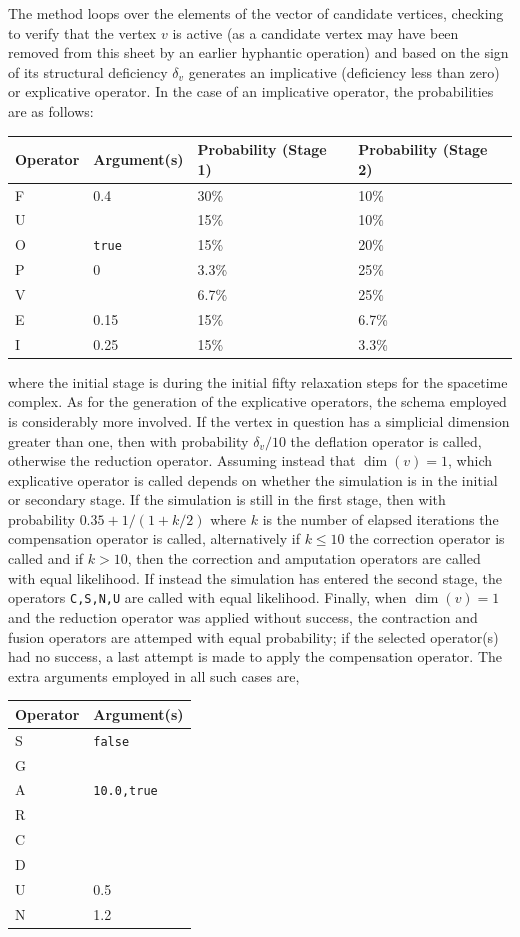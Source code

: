 \documentclass[12pt,letterpaper]{report}
\begin{document}
The method loops over the elements of the vector of candidate vertices, checking to verify that the vertex 
$v$ is active (as a candidate vertex may have been removed from this sheet by an earlier hyphantic 
operation) and based on the sign of its structural deficiency $\delta_v$ generates an implicative 
(deficiency less than zero) or explicative operator. In the case of an implicative operator, the 
probabilities are as follows:
\begin{center}
\begin{tabular}{|l|l|l|l|}
\hline
Operator & Argument(s) & Probability (Stage 1) & Probability (Stage 2)\\ 
\hline \hline
F & 0.4 & 30\% & 10\% \\
U &     & 15\% & 10\% \\
O & \texttt{true} & 15\% & 20\% \\
P & 0    & 3.3\% & 25\% \\
V &      & 6.7\% & 25\% \\ 
E & 0.15 & 15\%  & 6.7\% \\ 
I & 0.25 & 15\%  & 3.3\% \\ 
\hline
\end{tabular}
\end{center}
where the initial stage is during the initial fifty relaxation steps for the spacetime complex. As for the 
generation of the explicative operators, the schema employed is considerably more involved. If the vertex 
in question has a simplicial dimension greater than one, then with probability $\delta_v/10$ the deflation 
operator is called, otherwise the reduction operator. Assuming instead that $\dim(v) = 1$, which 
explicative operator is called depends on whether the simulation is in the initial or secondary stage. 
If the simulation is still in the first 
stage, then with probability $0.35 + 1/(1+k/2)$ where $k$ is the number of elapsed iterations the 
compensation operator is called, alternatively if $k \le 10$ the correction operator is called and if 
$k>10$, then the correction and amputation operators are called with equal likelihood. If instead the 
simulation has entered the second stage, the operators \texttt{{C,S,N,U}} are called with equal likelihood. 
Finally, when $\dim(v) = 1$ and the reduction operator was applied without success, the contraction and 
fusion operators are attemped with equal probability; if the selected operator(s) had no success, a last  
attempt is made to apply the compensation operator. The extra arguments employed in all such cases are, 
\begin{center}
\begin{tabular}{|l|l|}
\hline
Operator & Argument(s) \\
\hline \hline
S & \texttt{false} \\
G &     \\
A & \texttt{{10.0,true}} \\
R &    \\
C &    \\
D &    \\
U & 0.5\\
N & 1.2\\
\hline
\end{tabular}
\end{center}   
\end{document}
